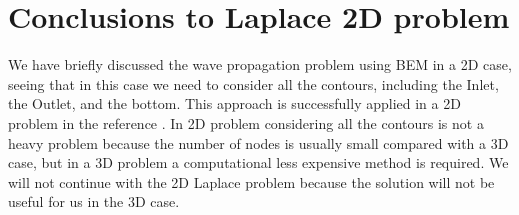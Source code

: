 \section{Conclusions to Laplace 2D problem}
\label{ss:laplace2D:conclusions}
%
We have briefly discussed the wave propagation problem using BEM in a 2D
case, seeing that in this case we need to consider all the contours,
including the Inlet, the Outlet, and the bottom. This approach is
successfully applied in a 2D problem in the reference \citep{vinayan2007}.
In 2D problem considering all the contours is not a heavy problem because
the number of nodes is usually small compared with a 3D case, but in a 3D
problem a computational less expensive method is required.\rc
%
We will not continue with the 2D Laplace problem because the solution will
not be useful for us in the 3D case.